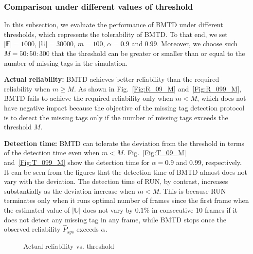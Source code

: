\documentclass[10pt, twocolumn]{IEEEtran}
\begin{document}
\subsubsection{Comparison under different values of threshold}

In this subsection, we evaluate the performance of BMTD under different thresholds, which represents the tolerability of BMTD. To that end, we set $|\mathbb{E}|=1000$, $|\mathbb{U}|=30000$, $m=100$, $\alpha=0.9$ and $0.99$. Moreover, we choose such $M=50:50:300$ that the threshold can be greater or smaller than or equal to the number of missing tags in the simulation.

\textbf{Actual reliability:}
BMTD achieves better reliability than the required reliability when $m \ge M$.
As shown in Fig.~\ref{Fig:R_09_M} and~\ref{Fig:R_099_M}, BMTD fails to achieve the required reliability only when $m<M$, which does not have negative impact because the objective of the missing tag detection protocol is to detect the missing tags only if the number of missing tags exceeds the threshold $M$.

\textbf{Detection time:}
BMTD can tolerate the deviation from the threshold in terms of the detection time even when $m<M$.
Fig.~\ref{Fig:T_09_M} and~\ref{Fig:T_099_M} show the detection time for $\alpha=0.9$ and $0.99$, respectively. It can be seen from the figures that the detection time of BMTD almost does not vary with the deviation. The detection time of RUN, by contrast, increases substantially as the deviation increase when $m<M$. This is because RUN terminates only when it runs optimal number of frames since the first frame when the estimated value of $|\mathbb{U}|$ does not vary by $0.1\%$ in consecutive $10$ frames if it does not detect any missing tag in any frame, while BMTD stops once the observed reliability $\hat P_{sys}$ exceeds $\alpha$.

\begin{figure}[htbp]
\centering
{}
\caption{Actual reliability vs. threshold}
\label{Fig:R_M}
\end{figure}
\end{document}
